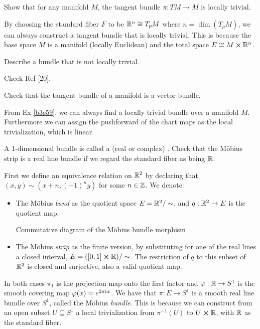 \documentclass[10pt]{article}
\begin{document}
\begin{example}\label{b3e59}
	Show that for any manifold $M$, the tangent bundle $\pi:TM\to M$ is locally trivial.
\end{example}
\sol By choosing the standard fiber $F$ to be $\mathbb{R}^n \cong T_pM$ where $n = \dim(T_pM)$, we can always construct a tangent bundle that is locally trivial. This is because the base space $M$ is a manifold (locally Euclidean) and the total space $E \cong M \cross \mathbb{R}^n$.


\begin{example}
	Describe a bundle that is not locally trivial.
\end{example}
\sol Check Ref [20].


\begin{example}
	Check that the tangent bundle of a manifold is a vector bundle.
\end{example}
\sol From Ex \ref{b3e59}, we can always find a locally trivial bundle over a manifold $M$. Furthermore we can assign the pushforward of the chart maps as the local trivialization, which is linear.


\begin{example}\label{b2e62}
	A 1-dimensional bundle is called a (real or complex) . Check that the Möbius strip is a real line bundle if we regard the standard fiber as being $\mathbb{R}$.
\end{example}
\sol First we define an equivalence relation on $\mathbb{R}^2$ by declaring that $(x,y) \sim (x+n,(-1)^ny)$ for some $n \in \mathbb{Z}$. We denote:
\begin{itemize}
	\item The Möbius \emph{band} as the quotient space $E = \mathbb{R}^2 / \sim$, and $q:\mathbb{R}^2 \to E$ is the quotient map.
	\begin{marginfigure}
		\caption{Commutative diagram of the Möbius bundle morphism}
	\end{marginfigure}	
	\item The Möbius \emph{strip} as the finite version, by substituting for one of the real lines a closed interval, $E = ([0,1] \cross \mathbb{R}) / \sim$. The restriction of $q$ to this subset of $\mathbb{R}^2$ is closed and surjective, also a valid quotient map.
\end{itemize}
In both cases $\pi_1$ is the projection map onto the first factor and $\varphi: \mathbb{R} \to S^1$ is the smooth covering map $\varphi(x) = e^{2\pi\mathrm{i}\mkern1mu x}$. We have that $\pi:E\to S^1$ is a smooth real line bundle over $S^1$, called the Möbius \emph{bundle}. This is because we can construct from an open subset $U \subseteq S^1$ a local trivialization from $\pi^{-1}(U)$ to $U \cross \mathbb{R}$, with $\mathbb{R}$ as the standard fiber.
\end{document}
